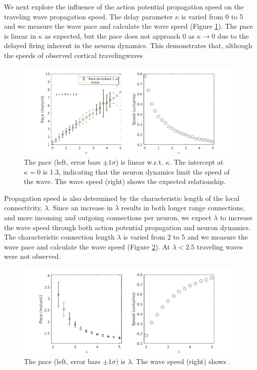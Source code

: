 \documentclass[a4paper,11pt]{article}
\begin{document}
We next explore the influence of the action potential propagation speed on the traveling wave propagation speed.
The delay parameter $\kappa$ is varied from 0 to 5 and we measure the wave pace and calculate the wave speed (Figure \ref{fig:delay_speed}).
The pace is linear in $\kappa$ as expected, but the pace does not approach $0$ as $\kappa \rightarrow 0$ due to the delayed firing inherent in the neuron dynamics.
This demonstrates that, although the speeds of observed cortical travelingwaves
\begin{figure}[!htb]
 \caption{The pace (left, error bars $\pm 1 \sigma$) is linear w.r.t. $\kappa$. The intercept at $\kappa=0$ is 1.3, indicating that the neuron dynamics limit the speed of the wave. The wave speed (right) shows the expected relationship. }
 \label{fig:delay_speed}
 \centering
   \includegraphics[width=\textwidth]{fig/WaveSpeed_Delay}
\end{figure}

\FloatBarrier

Propagation speed is also determined by the characteristic length of the local connectivity, $\lambda$.
Since an increase in $\lambda$ results in both longer range connections, and more incoming and outgoing connections per neuron, we expect $\lambda$ to increase the wave speed through both action potential propagation and neuron dynamics.
The characteristic connection length $\lambda$ is varied from 2 to 5 and we measure the wave pace and calculate the wave speed (Figure \ref{fig:delay_lambda}).
At $\lambda<2.5$ traveling waves were not observed.
\begin{figure}[!htb]
 \caption{ The pace (left, error bars $\pm 1 \sigma$) is  $\lambda$. The wave speed (right) shows . }
 \label{fig:delay_lambda}
 \centering
   \includegraphics[width=\textwidth]{fig/WaveSpeed_Lambda}
\end{figure}
\end{document}
